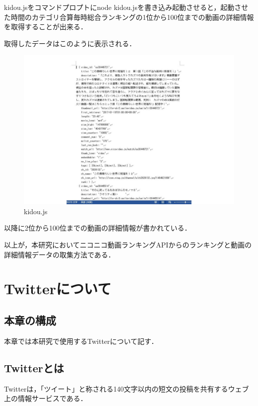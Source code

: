 \clearpage

kidou.jsをコマンドプロプトにnode kidou.jsを書き込み起動させると，起動させた時間のカテゴリ合算毎時総合ランキングの1位から100位までの動画の詳細情報を取得することが出来る．

取得したデータはこのように表示される．

	\begin{figure}[h]
		\centering
		\includegraphics[width=14cm]{zyouhou.pdf}
		\caption{kidou.js}\label{ace}
	\end{figure}
    
    以降に2位から100位までの動画の詳細情報が書かれている．



以上が，本研究においてニコニコ動画ランキングAPIからのランキングと動画の詳細情報データの取集方法である．

\clearpage
\chapter{Twitterについて}



\section{本章の構成}

本章では本研究で使用するTwitterについて記す．


\section{Twitterとは}
Twitterは，「ツイート」と称される140文字以内の短文の投稿を共有するウェブ上の情報サービスである．

